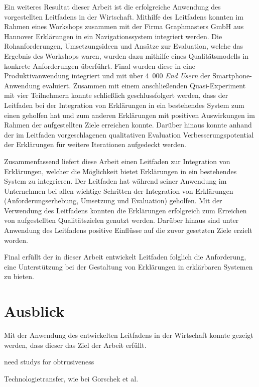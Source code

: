 Ein weiteres Resultat dieser Arbeit ist die erfolgreiche Anwendung des vorgestellten Leitfadens in der Wirtschaft. Mithilfe des Leitfadens konnten im Rahmen eines Workshops zusammen mit der Firma Graphmasters GmbH aus Hannover Erklärungen in ein Navigationssystem integriert werden. Die Rohanforderungen, Umsetzungsideen und Ansätze zur Evaluation, welche das Ergebnis des Workshops waren, wurden dazu mithilfe eines Qualitätsmodells in konkrete Anforderungen überführt. Final wurden diese in eine Produktivanwendung integriert und mit über 4~000 \textit{End Usern} der Smartphone-Anwendung evaluiert. Zusammen mit einem anschließenden Quasi-Experiment mit vier Teilnehmern konnte schließlich geschlussfolgert werden, dass der Leitfaden bei der Integration von Erklärungen in ein bestehendes System zum einen geholfen hat und zum anderen Erklärungen mit positiven Auswirkungen im Rahmen der aufgestellten Ziele erreichen konnte. Darüber hinaus konnte anhand der im Leitfaden vorgeschlagenen qualitativen Evaluation Verbesserungspotential der Erklärungen für weitere Iterationen aufgedeckt werden.

\newpage

Zusammenfassend liefert diese Arbeit einen Leitfaden zur Integration von Erklärungen, welcher die Möglichkeit bietet Erklärungen in ein bestehendes System zu integrieren. Der Leitfaden hat während seiner Anwendung im Unternehmen bei allen wichtige Schritten der Integration von Erklärungen (Anforderungserhebung, Umsetzung und Evaluation) geholfen. Mit der Verwendung des Leitfadens konnten die Erklärungen erfolgreich zum Erreichen von aufgestellten Qualitätszielen genutzt werden. Darüber hinaus sind unter Anwendung des Leitfadens positive Einflüsse auf die zuvor gesetzten Ziele erzielt worden.

Final erfüllt der in dieser Arbeit entwickelt Leitfaden folglich die Anforderung, eine Unterstützung bei der Gestaltung von Erklärungen in erklärbaren Systemen zu bieten.

\section{Ausblick}

Mit der Anwendung des entwickelten Leitfadens in der Wirtschaft konnte gezeigt werden, dass dieser das Ziel der Arbeit erfüllt.


need studys for obtrusiveness \cite{lim_2009_assessing}

Technologietransfer, wie bei Gorschek et al.


